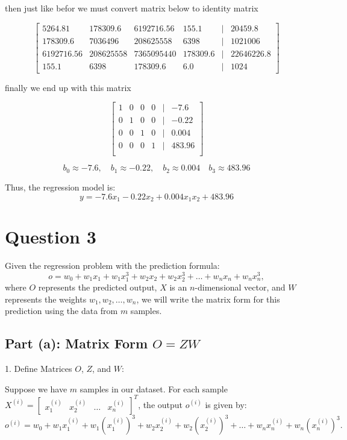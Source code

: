 \documentclass{article}
\begin{document}
	then just like befor we must convert matrix below to identity matrix
	
	\[
	\begin{bmatrix}
		5264.81 & 178309.6 & 6192716.56 & 155.1 & \vert & 20459.8 \\
		178309.6 & 7036496 & 208625558 & 6398 & \vert & 1021006 \\
		6192716.56 & 208625558 & 7365095440 & 178309.6 & \vert & 22646226.8 \\
		155.1 & 6398 & 178309.6 & 6.0 & \vert & 1024
	\end{bmatrix}
	\]
	
	finally we end up with this matrix
	
	\[
	\begin{bmatrix}
		1 & 0 & 0 & 0 & \vert & -7.6 \\
		0 & 1 & 0 & 0 & \vert & -0.22 \\
		0 & 0 & 1 & 0 & \vert & 0.004 \\
		0 & 0 & 0 & 1 & \vert & 483.96 \\
	\end{bmatrix}
	\]
	
	\[
	b_0 \approx -7.6, \quad b_1 \approx -0.22, \quad b_2 \approx 0.004 \quad b_3 \approx 483.96
	\]
	
	Thus, the regression model is:
	\[
	y = - 7.6 x_1 - 0.22 x_2 + 0.004 x_1 x_2 + 483.96
	\]
	
	\newpage
	\section*{Question 3}
	Given the regression problem with the prediction formula:
	\[
	o = w_0 + w_1 x_1 + w_1 x_1^3 + w_2 x_2 + w_2 x_2^3 + \dots + w_n x_n + w_n x_n^3,
	\]
	where \(O\) represents the predicted output, \(X\) is an \(n\)-dimensional vector, and \(W\) represents the weights \(w_1, w_2, \dots, w_n\), we will write the matrix form for this prediction using the data from \(m\) samples.
	
	\subsection*{Part (a): Matrix Form \(O = ZW\)}
	
	1. Define Matrices \(O\), \(Z\), and \(W\):
	
	Suppose we have \(m\) samples in our dataset. For each sample \(X^{(i)} = \begin{bmatrix} x_1^{(i)} & x_2^{(i)} & \dots & x_n^{(i)} \end{bmatrix}^T\), the output \(o^{(i)}\) is given by:
	\[
	o^{(i)} = w_0 + w_1 x_1^{(i)} + w_1 (x_1^{(i)})^3 + w_2 x_2^{(i)} + w_2 (x_2^{(i)})^3 + \dots + w_n x_n^{(i)} + w_n (x_n^{(i)})^3.
	\]
	
\end{document}
